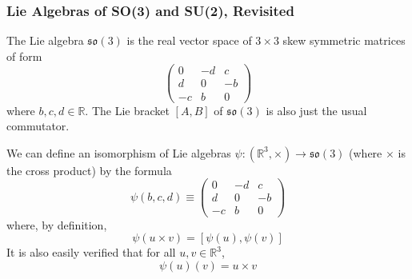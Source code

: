   \subsubsection{Lie Algebras of SO(3) and SU(2), Revisited}

    \begin{example}
      The Lie algebra $\mathfrak{so}(3)$ is the real vector space of $3 \times 3$ skew symmetric matrices of form 
      \begin{equation}
        \begin{pmatrix}
        0 & -d & c \\ d & 0 & -b \\ -c & b & 0
        \end{pmatrix}
      \end{equation}
      where $b, c, d \in \mathbb{R}$. The Lie bracket $[A,B]$ of $\mathfrak{so}(3)$ is also just the usual commutator. 

      We can define an isomorphism of Lie algebras $\psi: (\mathbb{R}^3, \times) \longrightarrow \mathfrak{so}(3)$ (where $\times$ is the cross product) by the formula 
      \begin{equation}
        \psi(b, c, d) \equiv \begin{pmatrix}
        0 & -d & c \\
        d & 0 & -b \\
        -c & b & 0
        \end{pmatrix}
      \end{equation}
      where, by definition, 
      \begin{equation}
        \psi(u \times v) = [\psi(u), \psi(v)]
      \end{equation}
      It is also easily verified that for all $u, v \in \mathbb{R}^3$, 
      \begin{equation}
        \psi(u) (v) = u \times v
      \end{equation}
    \end{example}

